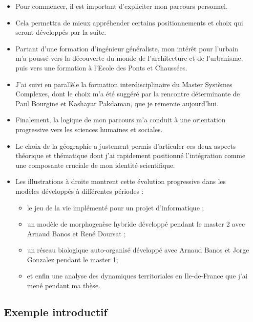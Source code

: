 \documentclass[12pt]{article}
\begin{document}
\begin{itemize}
	\item Pour commencer, il est important d'expliciter mon parcours personnel.
	\item Cela permettra de mieux appréhender certains positionnements et choix qui seront développés par la suite.
	\item Partant d'une formation d'ingénieur généraliste, mon intérêt pour l'urbain m'a poussé vers la découverte du monde de l'architecture et de l'urbanisme, puis vers une formation à l'Ecole des Ponts et Chaussées.
	\item J'ai suivi en parallèle la formation interdisciplinaire du Master Systèmes Complexes, dont le choix m'a été suggéré par la rencontre déterminante de Paul Bourgine et Kashayar Pakdaman, que je remercie aujourd'hui.
	\item Finalement, la logique de mon parcours m'a conduit à une orientation progressive vers les sciences humaines et sociales.
	\item Le choix de la géographie a justement permis d'articuler ces deux aspects théorique et thématique dont j'ai rapidement positionné l'intégration comme une composante cruciale de mon identité scientifique.
	\item Les illustrations à droite montrent cette évolution progressive dans les modèles développés à différentes périodes :
	\begin{itemize}
		\item le jeu de la vie implémenté pour un projet d'informatique ; 
		\item un modèle de morphogenèse hybride développé pendant le master 2 avec Arnaud Banos et René Doursat ;
		\item un réseau biologique auto-organisé développé avec Arnaud Banos et Jorge Gonzalez pendant le master 1;
		\item et enfin une analyse des dynamiques territoriales en Ile-de-France que j'ai mené pendant ma thèse.
	\end{itemize}
\end{itemize}


\newpage



\subsection*{Exemple introductif}
\end{document}
